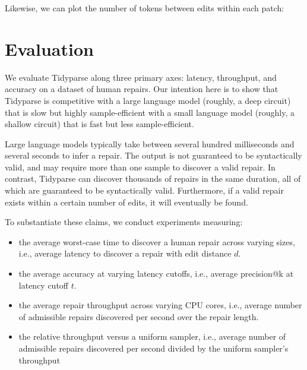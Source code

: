 \documentclass[sigplan,review,anonymous,acmsmall]{acmart}\settopmatter{printfolios=false,printccs=false,printacmref=false}
\begin{document}
  \noindent Likewise, we can plot the number of tokens between edits within each patch:

  \begin{figure}
  \end{figure}

  \section{Evaluation}

  We evaluate Tidyparse along three primary axes: latency, throughput, and accuracy on a dataset of human repairs. Our intention here is to show that Tidyparse is competitive with a large language model (roughly, a deep circuit) that is slow but highly sample-efficient with a small language model (roughly, a shallow circuit) that is fast but less sample-efficient.

  Large language models typically take between several hundred milliseconds and several seconds to infer a repair. The output is not guaranteed to be syntactically valid, and may require more than one sample to discover a valid repair. In contrast, Tidyparse can discover thousands of repairs in the same duration, all of which are guaranteed to be syntactically valid. Furthermore, if a valid repair exists within a certain number of edits, it will eventually be found.

  To substantiate these claims, we conduct experiments measuring:

  \begin{itemize}
    \item the average worst-case time to discover a human repair across varying sizes, i.e., average latency to discover a repair with edit distance $d$.
    \item the average accuracy at varying latency cutoffs, i.e., average precision@k at latency cutoff $t$.
    \item the average repair throughput across varying CPU cores, i.e., average number of admissible repairs discovered per second over the repair length.
    \item the relative throughput versus a uniform sampler, i.e., average number of admissible repairs discovered per second divided by the uniform sampler's throughput
  \end{itemize}
\end{document}
